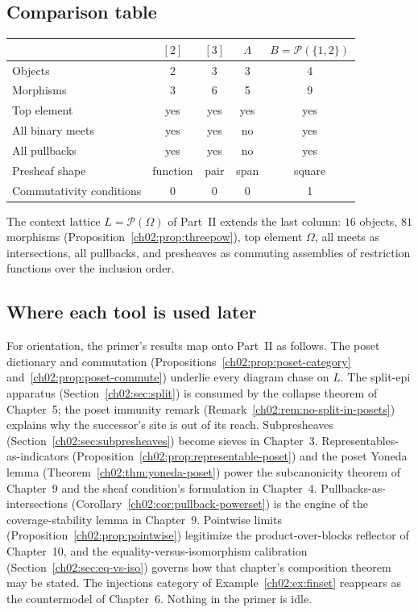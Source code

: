 \subsection{Comparison table}\label{ch02:sec:lab-table}

\begin{center}
\begin{tabular}{lcccc}
\toprule
 & $[2]$ & $[3]$ & $\Lambda$ & $B = \mathcal{P}(\{1,2\})$ \\
\midrule
Objects & 2 & 3 & 3 & 4 \\
Morphisms & 3 & 6 & 5 & 9 \\
Top element & yes & yes & yes & yes \\
All binary meets & yes & yes & no & yes \\
All pullbacks & yes & yes & no & yes \\
Presheaf shape & function & pair & span & square \\
Commutativity conditions & 0 & 0 & 0 & 1 \\
\bottomrule
\end{tabular}
\end{center}

The context lattice $L = \mathcal{P}(\Omega)$ of Part~II extends the
last column: $16$ objects, $81$ morphisms
(Proposition~\ref{ch02:prop:threepow}), top element $\Omega$, all
meets as intersections, all pullbacks, and presheaves as commuting
assemblies of restriction functions over the inclusion order.

\subsection{Where each tool is used later}\label{ch02:sec:usage-map}

For orientation, the primer's results map onto Part~II as follows.
The poset dictionary and commutation
(Propositions~\ref{ch02:prop:poset-category}
and~\ref{ch02:prop:poset-commute}) underlie every diagram chase on
$L$. The split-epi apparatus (Section~\ref{ch02:sec:split}) is
consumed by the collapse theorem of Chapter~5; the poset immunity
remark (Remark~\ref{ch02:rem:no-split-in-posets}) explains why the
successor's site is out of its reach. Subpresheaves
(Section~\ref{ch02:sec:subpresheaves}) become sieves in Chapter~3.
Representables-as-indicators
(Proposition~\ref{ch02:prop:representable-poset}) and the poset
Yoneda lemma (Theorem~\ref{ch02:thm:yoneda-poset}) power the
subcanonicity theorem of Chapter~9 and the sheaf condition's
formulation in Chapter~4. Pullbacks-as-intersections
(Corollary~\ref{ch02:cor:pullback-powerset}) is the engine of the
coverage-stability lemma in Chapter~9. Pointwise limits
(Proposition~\ref{ch02:prop:pointwise}) legitimize the
product-over-blocks reflector of Chapter~10, and the
equality-versus-isomorphism calibration
(Section~\ref{ch02:sec:eq-vs-iso}) governs how that chapter's
composition theorem may be stated. The injections category of
Example~\ref{ch02:ex:finset} reappears as the countermodel of
Chapter~6. Nothing in the primer is idle.

